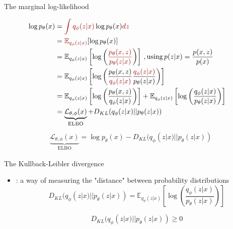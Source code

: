 \documentclass[10pt]{beamer}
\begin{document}
\begin{frame}{The marginal log-likelihood}

\begin{align*}
\log p_\theta(x)&=\uured{\int q_\phi(z|x)} \log p_\theta(x) \uured{ dz}&  \\
&=\uured{\mathbb{E}_{q_\phi(z|x)}}[\log p_\theta(x)] \\
&=\mathbb{E}_{q_\phi(z|x)}\left[\log \left(\uured{\frac{p_\theta(x,z)}{p_\theta(z|x)}}\right)\right]\,, \text{using}\, p(z|x)= \frac{p(x,z)}{p(x)} \\
&=\mathbb{E}_{q_\phi(z|x)}\left[\log \left(\frac{p_\theta(x,z)}{\uured{q_\phi(z|x)}}\frac{\uured{q_\phi(z|x)}}{p_\theta(z|x)}\right)\right] \\
&=\mathbb{E}_{q_\phi(z|x)}\left[\log \left(\frac{p_\theta(x,z)}{q_\phi(z|x)}\right)\right] + \mathbb{E}_{q_\phi(z|x)}\left[\log \left(\frac{q_\phi(z|x)}{p_\theta(z|x)}\right)\right] \\
&=\underbrace{\mathcal{L}_{\theta,\phi}(x)}_{\text{ELBO}} + D_{KL}(q_\phi(z|x)||p_\theta(z|x))\\
\end{align*}
\pause
\begin{align*}
\underbrace{\mathcal{L}_{\theta,\phi}(x)}_{\text{ELBO}} = \log p_\theta(x) - D_{KL}(q_\phi(z|x)||p_\theta(z|x))
\end{align*}

\end{frame}


\begin{frame}{The Kullback-Leibler divergence}

\begin{itemize}
\item {}: a way of measuring the "distance" between probability distributions
\[
D_{KL}(q_\phi(z|x)||p_\theta(z|x)) = \mathbb{E}_{q_\phi(z|x)}\left[\log \left(\frac{q_\phi(z|x)}{p_\theta(z|x)}\right)\right]
\]

\[
D_{KL}(q_\phi(z|x)||p_\theta(z|x)) \geq 0
\]
\end{itemize}

\end{frame}
\end{document}
